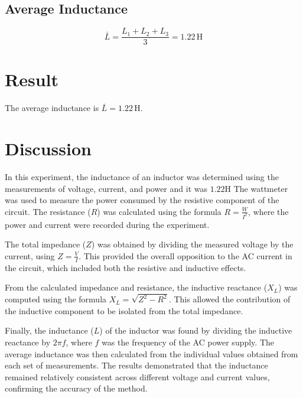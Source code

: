 \documentclass[a4paper,12pt]{article}
\begin{document}
	\subsection{Average Inductance}
	\[ \bar{L} = \frac{L_1 + L_2 + L_3}{3} = 1.22\,\text{H} \]
	
	\section{Result}
	The average inductance is \( \bar{L} = 1.22\,\text{H} \).
	

	\section{Discussion}
	
	In this experiment, the inductance of an inductor was determined using the measurements of voltage, current, and power and it was $1.22$H The wattmeter was used to measure the power consumed by the resistive component of the circuit. The resistance (\( R \)) was calculated using the formula \( R = \frac{W}{I^2} \), where the power and current were recorded during the experiment.
	
	The total impedance (\( Z \)) was obtained by dividing the measured voltage by the current, using \( Z = \frac{V}{I} \). This provided the overall opposition to the AC current in the circuit, which included both the resistive and inductive effects.
	
	From the calculated impedance and resistance, the inductive reactance (\( X_L \)) was computed using the formula \( X_L = \sqrt{Z^2 - R^2} \). This allowed the contribution of the inductive component to be isolated from the total impedance.
	
	Finally, the inductance (\( L \)) of the inductor was found by dividing the inductive reactance by \( 2\pi f \), where \( f \) was the frequency of the AC power supply. The average inductance was then calculated from the individual values obtained from each set of measurements. The results demonstrated that the inductance remained relatively consistent across different voltage and current values, confirming the accuracy of the method.
	
	
\end{document}
